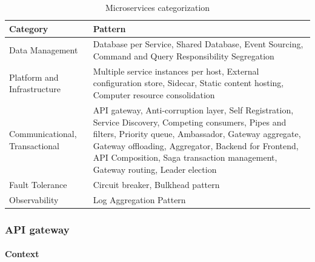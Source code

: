 \documentclass{bmcart}
\begin{document}
\begin{center}
  \begin{table}
  \renewcommand*{\arraystretch}{1.8}
  \begin{tabular}{ | m{3cm} | m{10cm} | }

      \hline

      Category & Pattern
      \\

      \hline

      Data Management &  Database per Service, Shared Database, Event Sourcing, Command and Query Responsibility Segregation

      \\

      \hline

      Platform and Infrastructure & Multiple service instances per host, External configuration store, Sidecar, Static content hosting, Computer resource consolidation

      \\

      \hline

      Communicational, Transactional & API gateway,  Anti-corruption layer, Self Registration, Service Discovery, Competing consumers, Pipes and filters, Priority queue, Ambassador, Gateway aggregate, Gateway offloading, Aggregator, Backend for Frontend, API Composition, Saga transaction management, Gateway routing, Leader election
      

      \\

      \hline

      Fault Tolerance & Circuit breaker, Bulkhead pattern

      \\
      \hline

      Observability & Log Aggregation Pattern

      \\
      \hline


  \end{tabular}
  \caption{Microservices categorization}
  \label{microservices-categorization}
  \end{table}
\end{center}

\subsubsection{API gateway}

\paragraph{Context}
\end{document}

